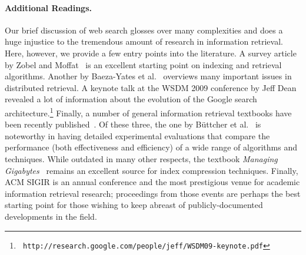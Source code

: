 \paragraph{Additional Readings.} 
Our brief discussion of web search glosses over many complexities and
does a huge injustice to the tremendous amount of research in
information retrieval.  Here, however, we provide a few entry points
into the literature.  A survey article by Zobel and
Moffat~\cite{Zobel_Moffat_2006} is an excellent starting point on
indexing and retrieval algorithms.  Another by Baeza-Yates et
al.~\cite{Baeza-Yates_etal_2007} overviews many important issues in
distributed retrieval.  A keynote talk at the WSDM 2009 conference by
Jeff Dean revealed a lot of information about the evolution of the
Google search architecture.\footnote{\texttt{
  http://research.google.com/people/jeff/WSDM09-keynote.pdf}} Finally,
a number of general information retrieval textbooks have been recently
published~\cite{Manning_etal_2008,Croft_etal_2009,Buttcher_etal_2010}.
Of these three, the one by B\"uttcher et al.~\cite{Buttcher_etal_2010}
is noteworthy in having detailed experimental evaluations that compare
the performance (both effectiveness and efficiency) of a wide range of
algorithms and techniques.  While outdated in many other respects, the
textbook \emph{Managing Gigabytes}~\cite{Witten_etal_1999} remains an
excellent source for index compression techniques.  Finally, ACM SIGIR
is an annual conference and the most prestigious venue for academic
information retrieval research; proceedings from those events are
perhaps the best starting point for those wishing to keep abreast of
publicly-documented developments in the field.
